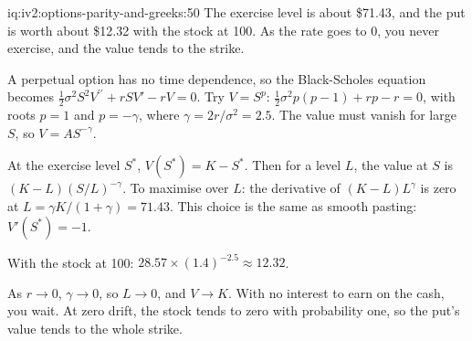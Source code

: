 \begin{solution}{iq:iv2:options-parity-and-greeks:50}
The exercise level is about \$71.43, and the put is worth about \$12.32 with the stock at 100. As the rate goes to 0, you never exercise, and the value tends to the strike.

A perpetual option has no time dependence, so the Black-Scholes equation becomes $\tfrac12\sigma^2S^2V^{\prime\prime} + rSV' - rV = 0$. Try $V = S^p$: $\tfrac12\sigma^2p(p - 1) + rp - r = 0$, with roots $p = 1$ and $p = -\gamma$, where $\gamma = 2r/\sigma^2 = 2.5$. The value must vanish for large $S$, so $V = AS^{-\gamma}$.

At the exercise level $S^*$, $V(S^*) = K - S^*$. Then for a level $L$, the value at $S$ is $(K - L)(S/L)^{-\gamma}$. To maximise over $L$: the derivative of $(K - L)L^\gamma$ is zero at $L = \gamma K/(1 + \gamma) = 71.43$. This choice is the same as smooth pasting: $V'(S^*) = -1$.

With the stock at 100: $28.57 \times (1.4)^{-2.5} \approx 12.32$.

As $r \to 0$, $\gamma \to 0$, so $L \to 0$, and $V \to K$. With no interest to earn on the cash, you wait. At zero drift, the stock tends to zero with probability one, so the put's value tends to the whole strike.

\end{solution}
